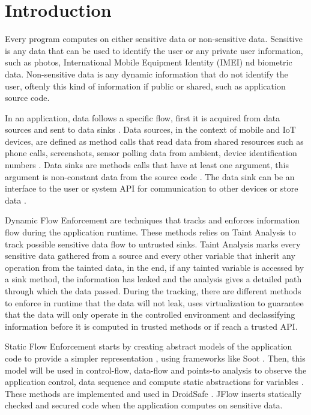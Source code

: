 \chapter{Introduction}
Every program computes on either sensitive data or non-sensitive data. Sensitive is any data that can be used to 
identify the user or any private user information, such as photos, International Mobile Equipment Identity (IMEI) 
nd biometric data. Non-sensitive data is any dynamic information that do not identify the user, oftenly this kind 
of information if public or shared, such as application source code.

In an application, data follows a specific flow, first it is acquired from data sources and sent to data 
sinks \citep{mccabe2003network}. Data sources, in the context of mobile and IoT devices, are defined as method 
calls that read data from shared resources such as phone calls, screenshots, sensor polling data from ambient, 
device identification numbers \citep{rasthofer2014machine}. Data sinks are methods calls that have at least one 
argument, this argument is non-constant data from the source code \citep{rasthofer2014machine}. The data sink can be
an interface to the user or system API for communication to other devices or store data \citep{viet2010specifying}.

Dynamic Flow Enforcement are techniques that tracks and enforces information flow during the application runtime. 
These methods relies on Taint Analysis to track possible sensitive data flow to untrusted sinks. Taint Analysis 
marks every sensitive data gathered from a source and every other variable that inherit any operation 
from the tainted data, in the end, if any tainted variable is accessed by a sink method, the information has 
leaked and the analysis gives a detailed path through which the data passed. During the tracking, there are 
different methods to enforce in runtime that the data will not leak, \cite{fernandes2016flowfence} uses 
virtualization to guarantee that the data will only operate in the controlled environment and \cite{sun2017data} 
declassifying information before it is computed in trusted methods or if reach a trusted API.

Static Flow Enforcement starts by creating abstract models of the application code to provide a simpler 
representation \citep{myers1999jflow}, using frameworks like Soot \citep{vallee2000optimizing}. Then, this model 
will be used in control-flow, data-flow and points-to analysis to observe the application control, data sequence 
and compute static abstractions for variables \cite{li2017static}. These methods are implemented and used in 
DroidSafe \cite{gordon2015information}. JFlow \cite{myers1999jflow} inserts statically checked and secured code 
when the application computes on sensitive data.

